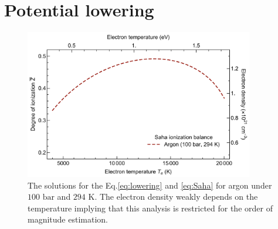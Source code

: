 \section{Potential lowering}
\label{sec:ch4-4}

\begin{figure}[ht!]
\centering
\includegraphics[width=100mm]{figures/ch4/Saha/balance.pdf}
\caption{The solutions for the Eq.\ref{eq:lowering} and \ref{eq:Saha} for argon under $100 \text{ bar}$ and $294 \text{ K}$. The electron density weakly depends on the temperature implying that this analysis is restricted for the order of magnitude estimation.}
\label{fig:SahaBalance}
\end{figure}


